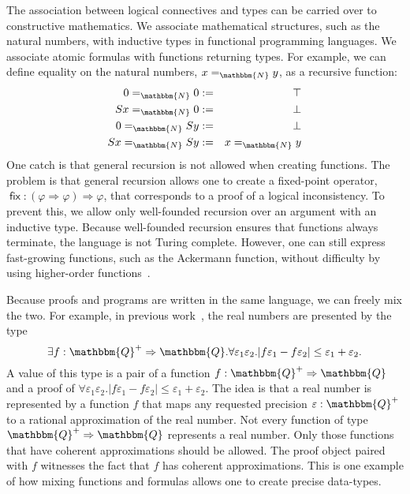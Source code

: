 \documentclass{elsarticle}
\newcommand{\assign}{:=}
\newcommand{\tmop}[1]{\ensuremath{\operatorname{#1}}}
\newcommand{\upl}{+}
\begin{document}
The association between logical connectives and types can be carried over to
constructive mathematics. We associate mathematical structures, such as the
natural numbers, with inductive types in functional programming languages. We
associate atomic formulas with functions returning types. For example, we can
define equality on the natural numbers, $x =_{\mathbbm{N}} y$, as a recursive
function:
\begin{eqnarray*}
  0 =_{\mathbbm{N}} 0 & \assign & \top\\
  S x =_{\mathbbm{N}} 0 & \assign & \bot\\
  0 =_{\mathbbm{N}} S y & \assign & \bot\\
  S x =_{\mathbbm{N}} S y & \assign & x =_{\mathbbm{N}} y
\end{eqnarray*}
One catch is that general recursion is not allowed when creating functions.
The problem is that general recursion allows one to create a fixed-point
operator, $\tmop{\mathsf{fix}} : (\varphi \Rightarrow \varphi) \Rightarrow
\varphi$, that corresponds to a proof of a logical inconsistency. To prevent
this, we allow only well-founded recursion over an argument with an inductive
type. Because well-founded recursion ensures that functions always terminate,
the language is not Turing complete. However, one can still express
fast-growing functions, such as the Ackermann function, without difficulty by
using higher-order functions~{\cite{Thompson:1991}}.

Because proofs and programs are written in the same language, we can freely
mix the two. For example, in previous work~{\cite{OConnor:mscs}}, the real
numbers are presented by the type
\begin{equation}
  \exists f : \mathbbm{Q}^{\upl} \Rightarrow \mathbbm{Q}. \forall
  \varepsilon_1 \varepsilon_2 . |f \varepsilon_1 - f \varepsilon_2 | \leq
  \varepsilon_1 + \varepsilon_2 . \label{R}
\end{equation}
A value of this type is a pair of a function $f : \mathbbm{Q}^{\upl}
\Rightarrow \mathbbm{Q}$ and a proof of $\forall \varepsilon_1 \varepsilon_2 .
|f \varepsilon_1 - f \varepsilon_2 | \leq \varepsilon_1 + \varepsilon_2$. The
idea is that a real number is represented by a function $f$ that maps any
requested precision $\varepsilon : \mathbbm{Q}^+$ to a rational approximation
of the real number. Not every function of type $\mathbbm{Q}^{\upl} \Rightarrow
\mathbbm{Q}$ represents a real number. Only those functions that have coherent
approximations should be allowed. The proof object paired with $f$ witnesses
the fact that $f$ has coherent approximations. This is one example of how
mixing functions and formulas allows one to create precise data-types.
\end{document}
